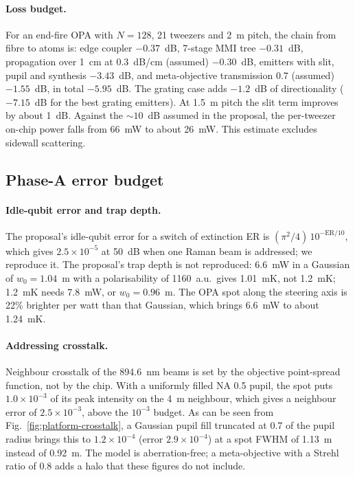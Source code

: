 \paragraph{Loss budget.} For an end-fire OPA with $N = 128$, 21 tweezers and 2~\textmu m pitch, the chain from fibre to atoms is: edge coupler $-0.37$~dB, 7-stage MMI tree $-0.31$~dB, propagation over 1~cm at 0.3~dB/cm (assumed) $-0.30$~dB, emitters with slit, pupil and synthesis $-3.43$~dB, and meta-objective transmission 0.7 (assumed) $-1.55$~dB, in total $-5.95$~dB. The grating case adds $-1.2$~dB of directionality ($-7.15$~dB for the best grating emitters). At 1.5~\textmu m pitch the slit term improves by about 1~dB. Against the ${\sim}10$~dB assumed in the proposal, the per-tweezer on-chip power falls from 66~mW to about 26~mW. This estimate excludes sidewall scattering.

\subsection{Phase-A error budget}\label{sec:platform-budget}

\paragraph{Idle-qubit error and trap depth.} The proposal's idle-qubit error for a switch of extinction ER is $(\pi^2/4)\,10^{-\mathrm{ER}/10}$, which gives $2.5\times10^{-5}$ at 50~dB when one Raman beam is addressed; we reproduce it. The proposal's trap depth is not reproduced: 6.6~mW in a Gaussian of $w_0 = 1.04$~\textmu m with a polarisability of 1160~a.u.\ gives 1.01~mK, not 1.2~mK; 1.2~mK needs 7.8~mW, or $w_0 = 0.96$~\textmu m. The OPA spot along the steering axis is 22\% brighter per watt than that Gaussian, which brings 6.6~mW to about 1.24~mK.

\paragraph{Addressing crosstalk.} Neighbour crosstalk of the 894.6~nm beams is set by the objective point-spread function, not by the chip. With a uniformly filled NA 0.5 pupil, the spot puts $1.0\times10^{-3}$ of its peak intensity on the 4~\textmu m neighbour, which gives a neighbour error of $2.5\times10^{-3}$, above the $10^{-3}$ budget. As can be seen from Fig.~\ref{fig:platform-crosstalk}, a Gaussian pupil fill truncated at 0.7 of the pupil radius brings this to $1.2\times10^{-4}$ (error $2.9\times10^{-4}$) at a spot FWHM of 1.13~\textmu m instead of 0.92~\textmu m. The model is aberration-free; a meta-objective with a Strehl ratio of 0.8 adds a halo that these figures do not include.


